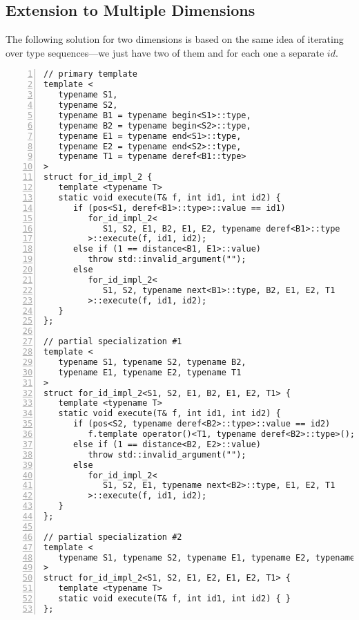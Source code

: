 \documentclass[10pt,a4paper]{article}
\theoremstyle{definition}\newtheorem{problem}{Problem}
\providecommand{\symidb}{\ensuremath{\mathit{id}}}
\providecommand{\symidbx}{\symidb\xspace}
\begin{document}
\subsection{Extension to Multiple Dimensions}
\label{sec:simpleext}

The following solution for two dimensions is based on the same idea of iterating over type sequences---we just have two of them and for each one a separate \symidbx. {\small
\begin{lstlisting}[numbers=left,xleftmargin=2em]
// primary template
template <                                                                       (* \label{lst:md:pts} *)
   typename S1,
   typename S2,
   typename B1 = typename begin<S1>::type,
   typename B2 = typename begin<S2>::type,
   typename E1 = typename end<S1>::type,
   typename E2 = typename end<S2>::type,
   typename T1 = typename deref<B1::type>
>
struct for_id_impl_2 {
   template <typename T>
   static void execute(T& f, int id1, int id2) {
      if (pos<S1, deref<B1>::type>::value == id1)                                (* \label{lst:md:condo} *)
         for_id_impl_2< 
            S1, S2, E1, B2, E1, E2, typename deref<B1>::type
         >::execute(f, id1, id2);
      else if (1 == distance<B1, E1>::value)
         throw std::invalid_argument("");    
      else
         for_id_impl_2<
            S1, S2, typename next<B1>::type, B2, E1, E2, T1
         >::execute(f, id1, id2);
   }
};                                                                               (* \label{lst:md:pte} *)

// partial specialization #1
template <                                                                       (* \label{lst:md:pss} *)
   typename S1, typename S2, typename B2,
   typename E1, typename E2, typename T1
>
struct for_id_impl_2<S1, S2, E1, B2, E1, E2, T1> {
   template <typename T>
   static void execute(T& f, int id1, int id2) {
      if (pos<S2, typename deref<B2>::type>::value == id2)                       (* \label{lst:md:condt} *)
         f.template operator()<T1, typename deref<B2>::type>();
      else if (1 == distance<B2, E2>::value)
         throw std::invalid_argument("");
      else
         for_id_impl_2<
            S1, S2, E1, typename next<B2>::type, E1, E2, T1
         >::execute(f, id1, id2);
   }
};                                                                               (* \label{lst:md:pse} *)

// partial specialization #2
template <
   typename S1, typename S2, typename E1, typename E2, typename T1
>
struct for_id_impl_2<S1, S2, E1, E2, E1, E2, T1> {
   template <typename T>
   static void execute(T& f, int id1, int id2) { }
};
\end{lstlisting}
}
\end{document}
